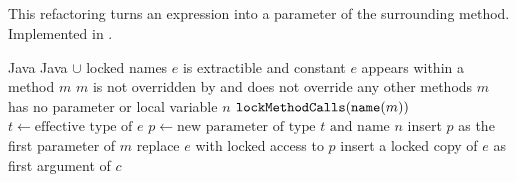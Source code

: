 \subsection{}
This refactoring turns an expression into a parameter of the surrounding method. Implemented in .

\begin{algorithm}
\caption{$\refactoring{Introduce Parameter}(e : \type{Expr}, n : \type{Name})$}
\begin{algorithmic}[1]
\REQUIRE Java
\ENSURE Java $\cup$ locked names
\medskip
\STATE \assert $e$ is extractible and constant
\STATE \assert $e$ appears within a method $m$
\STATE \assert $m$ is not overridden by and does not override any other methods
\STATE \assert $m$ has no parameter or local variable $n$
\STATE $\text{\texttt{lockMethodCalls}}(\text{\texttt{name}}(m))$
\STATE $t \leftarrow \text{effective type of $e$}$
\STATE $p \leftarrow \text{new parameter of type $t$ and name $n$}$
\STATE insert $p$ as the first parameter of $m$
\STATE replace $e$ with locked access to $p$
  \STATE insert a locked copy of $e$ as first argument of $c$
\ENDFOR
\end{algorithmic}
\end{algorithm}
